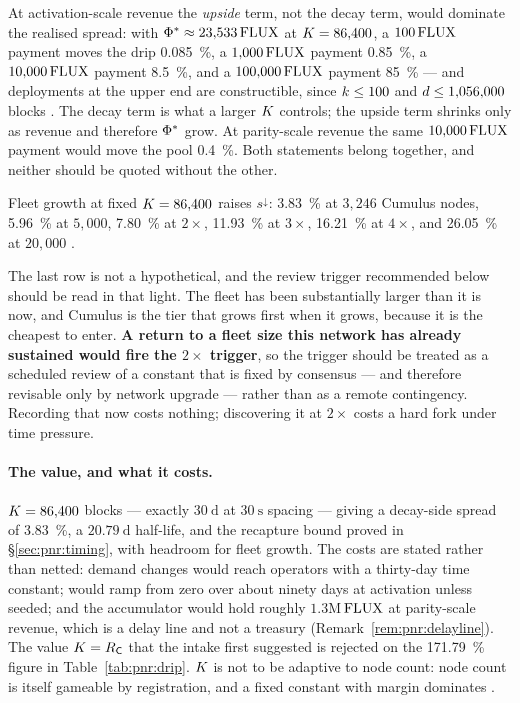 At activation-scale revenue the \emph{upside} term, not the decay term, would dominate the realised
spread: with $\Phi^{*} \approx 23{,}533\,\mathrm{FLUX}$ at $K = 86{,}400$, a $100\,\mathrm{FLUX}$ payment moves the
drip \SI{0.085}{\percent}, a $1{,}000\,\mathrm{FLUX}$ payment \SI{0.85}{\percent}, a $10{,}000\,\mathrm{FLUX}$ payment
\SI{8.5}{\percent}, and a $100{,}000\,\mathrm{FLUX}$ payment \SI{85}{\percent} --- and deployments at the
upper end are constructible, since $k \le 100$ and $d \le 1{,}056{,}000$ blocks
. The decay term is what a
larger $K$ controls; the upside term shrinks only as revenue and therefore $\Phi^{*}$ grow. At
parity-scale revenue the same $10{,}000\,\mathrm{FLUX}$ payment would move the pool \SI{0.4}{\percent}. Both
statements belong together, and neither should be quoted without the other.

Fleet growth at fixed $K = 86{,}400$ raises $s^{\downarrow}$: \SI{3.83}{\percent} at $3{,}246$
Cumulus nodes, \SI{5.96}{\percent} at $5{,}000$, \SI{7.80}{\percent} at $2\times$,
\SI{11.93}{\percent} at $3\times$, \SI{16.21}{\percent} at $4\times$, and \SI{26.05}{\percent} at
$20{,}000$ .

The last row is not a hypothetical, and the review trigger recommended below should be read in that
light. The fleet has been substantially larger than it is now, and Cumulus is the tier that grows
first when it grows, because it is the cheapest to enter. \textbf{A return to a fleet size this
network has already sustained would fire the $2\times$ trigger}, so the trigger should be treated as
a scheduled review of a constant that is fixed by consensus --- and therefore revisable only by
network upgrade --- rather than as a remote contingency. Recording that now costs nothing; discovering
it at $2\times$ costs a hard fork under time pressure.

\paragraph{The value, and what it costs.} $K = 86{,}400$ blocks --- exactly $\SI{30}{\day}$ at
$\SI{30}{\second}$ spacing --- giving a decay-side spread of \SI{3.83}{\percent}, a
$\SI{20.79}{\day}$ half-life, and the recapture bound proved in \S\ref{sec:pnr:timing}, with
headroom for fleet growth. The costs are stated rather than netted: demand changes would reach
operators with a thirty-day time constant; \PNR would ramp from zero over about ninety days at
activation unless seeded; and the accumulator would hold roughly $1.3$M$\,\mathrm{FLUX}$ at parity-scale
revenue, which is a delay line and not a treasury (Remark~\ref{rem:pnr:delayline}). The value
$K = R_{\mathsf{C}}$ that the intake first suggested is rejected on the \SI{171.79}{\percent} figure
in Table~\ref{tab:pnr:drip}. $K$ is not to be adaptive to node count: node count is itself
gameable by registration, and a fixed constant with margin dominates
.

